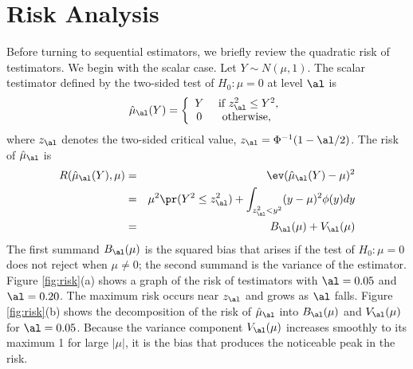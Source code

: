 \documentclass[12pt]{article}
\begin{document}
\section{ Risk Analysis}


 Before turning to sequential estimators, we briefly review the quadratic risk
 of testimators.  We begin with the scalar case.  Let $Y \sim N(\mu,1)$.  The
 scalar testimator defined by the two-sided test of $H_0: \mu=0$ at level $\al$
 is
 \begin{equation}
   \hat\mu_\al(Y) = \left\{
     \begin{array}{cc}
        Y & \mbox{ if } z_\al^2 \le Y^2, \cr
        0 & \mbox{ otherwise, }
      \end{array} \right.
 \label{eq:muHat}
 \end{equation}
 where $z_\al$ denotes the two-sided critical value, $z_\al = \Phi^{-1}(1-\al/2)$. 
 The risk of $\hat\mu_\al$ is
 \begin{eqnarray}
   R(\hat\mu_\al(Y), \mu) 
     &=& \ev(\hat\mu_\al(Y) - \mu)^2  \cr
     &=& \mu^2 \pr(Y^2 \le z_\al^2) 
         + \int_{z_\al^2<y^2} (y-\mu)^2 \phi(y) dy \cr
     &=& B_\al(\mu) + V_\al(\mu)
 \label{eq:risk_mu_al}
 \end{eqnarray}
 The first summand $B_\al(\mu)$ is the squared bias that arises if the test of
 $H_0: \mu=0$ does not reject when $\mu \ne 0$; the second summand is the
 variance of the estimator.  Figure \ref{fig:risk}(a) shows a graph of the risk
 of testimators with $\al=0.05$ and $\al = 0.20$.  The maximum risk occurs
 near $z_\al$ and grows as $\al$ falls.  Figure \ref{fig:risk}(b) shows
 the decomposition of the risk of $\hat\mu_\al$ into $B_\al(\mu)$ and
 $V_\al(\mu)$ for $\al = 0.05$.  Because the variance component $V_\al(\mu)$
 increases smoothly to its maximum 1 for large $|\mu|$, it is the bias that
 produces the noticeable peak in the risk.
\end{document}
